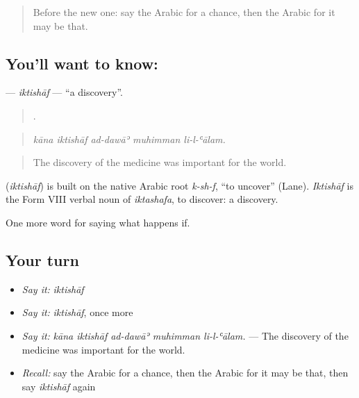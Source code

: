 \label{lesson:AR-C421-iktishaf}



\begin{quote}
Before the new one: say the Arabic for a chance, then the Arabic for it may be that.
\end{quote}

\subsection*{You'll want to know: }
\textbf{} — \emph{iktishāf} — \textquotedblleft{}a discovery\textquotedblright{}.

\begin{quote}
    .
\end{quote}

\begin{quote}
\emph{kāna iktishāf ad-dawāʾ muhimman li-l-ʿālam.}
\end{quote}

\begin{quote}
The discovery of the medicine was important for the world.
\end{quote}

\begin{cousinweb}
\textbf{} (\emph{iktishāf}) is built on the native Arabic root \emph{k-sh-f}, \textquotedblleft{}to uncover\textquotedblright{} (Lane). \emph{Iktishāf} is the Form VIII verbal noun of \emph{iktashafa}, to discover: a discovery.
\end{cousinweb}

\begin{grammarlens}[title={What you've built}]
One more word for saying what happens if.
\end{grammarlens}

\subsection*{Your turn}
\begin{itemize}
\raggedright
  \item \emph{Say it:} \emph{iktishāf}
  \item \emph{Say it:} \emph{iktishāf}, once more
  \item \emph{Say it:} \emph{kāna iktishāf ad-dawāʾ muhimman li-l-ʿālam.} — The discovery of the medicine was important for the world.
  \item \emph{Recall:} say the Arabic for a chance, then the Arabic for it may be that, then say \emph{iktishāf} again
\end{itemize}

